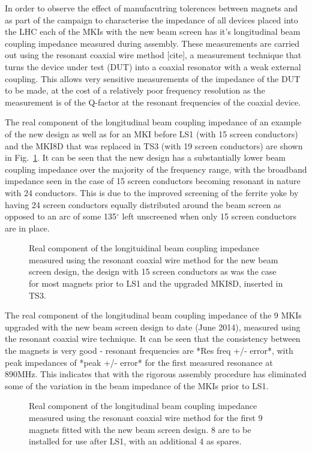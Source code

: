 \documentclass[a4paper,
              ]{jacow}
\begin{document}
In order to observe the effect of manufacutring tolerences between magnets and as part of the campaign to characterise the impedance of all devices placed into the LHC each of the MKIs with the new beam screen has it's longitudinal beam coupling impedance measured during assembly. These measurements are carried out using the resonant coaxial wire method [cite], a measurement technique that turns the device under test (DUT) into a coaxial resonator with a weak external coupling. This allows very sensitive measurements of the impedance of the DUT to be made, at the cost of a relatively poor frequency resolution as the measurement is of the Q-factor at the resonant frequencies of the coaxial device.

The real component of the longitudinal beam coupling impedance of an example of the new design as well as for an MKI before LS1 (with 15 screen conductors) and the MKI8D that was replaced in TS3 (with 19 screen conductors) are shown in Fig.~\ref{fig:Imp241915}. It can be seen that the new design has a substantially lower beam coupling impedance over the majority of the frequency range, with the broadband impedance seen in the case of 15 screen conductors becoming resonant in nature with 24 conductors. This is due to the improved screening of the ferrite yoke by having 24 screen conductors equally distributed around the beam screen as opposed to an arc of some 135$^{\circ}$ left unscreened when only 15 screen conductors are in place.

\begin{figure}
\caption{Real component of the longituidinal beam coupling impedance measured using the resonant coaxial wire method for the new beam screen design, the design with 15 screen conductors as was the case for most magnets prior to LS1 and the upgraded MKI8D, inserted in TS3.}
\label{fig:Imp241915}
\end{figure}

The real component of the longitudinal beam coupling impedance of the 9 MKIs upgraded with the new beam screen design to date (June 2014), measured using the resonant coaxial wire technique. It can be seen that the consistency between the magnets is very good - resonant frequencies are *Res freq +/- error*, with peak impedances of *peak +/- error* for the first measured resonance at 890MHz. This indicates that with the rigorous assembly procedure has eliminated some of the variation in the beam impedance of the MKIs prior to LS1.

\begin{figure}
\caption{Real component of the longitudinal beam coupling impedance measured using the resonant coaxial wire method for the first 9 magnets fitted with the new beam screen design. 8 are to be installed for use after LS1, with an additional 4 as spares.}
\label{fig:allNewMKIImp}
\end{figure}
\end{document}

